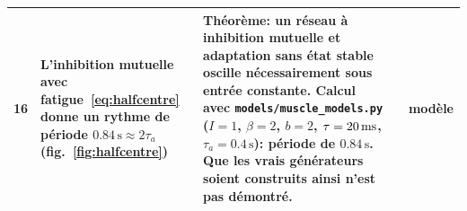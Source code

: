 {\begin{longtable}{>{\raggedright}p{0.5cm}>{\raggedright}p{4.0cm}>{\raggedright}p{5.6cm}>{\raggedright}p{2.3cm}>{\raggedright\arraybackslash}p{1.7cm}}
16 & L'inhibition mutuelle avec fatigue~\eqref{eq:halfcentre} donne un rythme de période $0.84\,\text{s}\approx2\tau_a$ (fig.~\ref{fig:halfcentre}) & Théorème: un réseau à inhibition mutuelle et adaptation sans état stable oscille nécessairement sous entrée constante. Calcul avec \texttt{models/\allowbreak muscle\_\allowbreak models.py} ($I=1$, $\beta=2$, $b=2$, $\tau=20\,\text{ms}$, $\tau_a=0.4\,\text{s}$): période de $0.84\,\text{s}$. Que les vrais générateurs soient construits ainsi n'est pas démontré. & \cite{Matsuoka1985osc} & modèle \\
\bottomrule
\end{longtable}}
